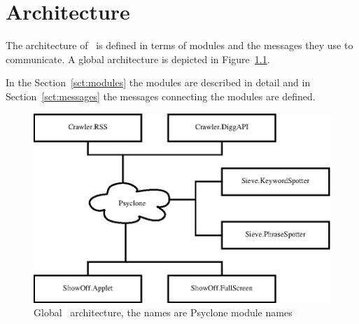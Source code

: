 \chapter{\label{cpt:architecture}Architecture}

The architecture of \Amber\ is defined in terms of modules and the messages
they use to communicate. A global architecture is depicted in
Figure~\ref{fig:global-architecture}.

In the Section~\ref{sct:modules} the modules are described in detail and in
Section~\ref{sct:messages} the messages connecting the modules are defined.

\begin{figure}
    \centering
    \includegraphics{image/global-architecture}
    \caption{\label{fig:global-architecture}Global \Amber\ architecture, the names are Psyclone module names}
\end{figure}





